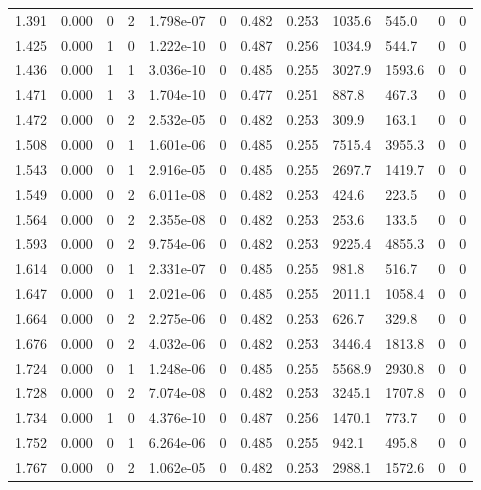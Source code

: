 \documentclass[preview]{standalone}
\begin{document}
{{{\begin{tabular}{L{1.2cm}C{1.2cm} C{0.3cm}C{0.5cm} C{1.4cm}C{1.4cm} C{1.4cm}C{1.4cm} C{1.6cm}C{1.6cm} C{1.6cm}C{1.6cm}}
  1.391  &  0.000  & 0     &  2 &  1.798e-07  & 0  &  0.482&   0.253& 1035.6 & 545.0   &  0 & 0  \\ 
  1.425  &  0.000  & 1     &  0 &  1.222e-10  & 0  &  0.487&   0.256& 1034.9 & 544.7   &  0 & 0  \\ 
  1.436  &  0.000  & 1     &  1 &  3.036e-10  & 0  &  0.485&   0.255& 3027.9 & 1593.6   &  0 & 0  \\ 
  1.471  &  0.000  & 1     &  3 &  1.704e-10  & 0  &  0.477&   0.251& 887.8 & 467.3   &  0 & 0  \\ 
  1.472  &  0.000  & 0     &  2 &  2.532e-05  & 0  &  0.482&   0.253& 309.9 & 163.1   &  0 & 0  \\ 
  1.508  &  0.000  & 0     &  1 &  1.601e-06  & 0  &  0.485&   0.255& 7515.4 & 3955.3   &  0 & 0  \\ 
  1.543  &  0.000  & 0     &  1 &  2.916e-05  & 0  &  0.485&   0.255& 2697.7 & 1419.7   &  0 & 0  \\ 
  1.549  &  0.000  & 0     &  2 &  6.011e-08  & 0  &  0.482&   0.253& 424.6 & 223.5   &  0 & 0  \\ 
  1.564  &  0.000  & 0     &  2 &  2.355e-08  & 0  &  0.482&   0.253& 253.6 & 133.5   &  0 & 0  \\ 
  1.593  &  0.000  & 0     &  2 &  9.754e-06  & 0  &  0.482&   0.253& 9225.4 & 4855.3   &  0 & 0  \\ 
  1.614  &  0.000  & 0     &  1 &  2.331e-07  & 0  &  0.485&   0.255& 981.8 & 516.7   &  0 & 0  \\ 
  1.647  &  0.000  & 0     &  1 &  2.021e-06  & 0  &  0.485&   0.255& 2011.1 & 1058.4   &  0 & 0  \\ 
  1.664  &  0.000  & 0     &  2 &  2.275e-06  & 0  &  0.482&   0.253& 626.7 & 329.8   &  0 & 0  \\ 
  1.676  &  0.000  & 0     &  2 &  4.032e-06  & 0  &  0.482&   0.253& 3446.4 & 1813.8   &  0 & 0  \\ 
  1.724  &  0.000  & 0     &  1 &  1.248e-06  & 0  &  0.485&   0.255& 5568.9 & 2930.8   &  0 & 0  \\ 
  1.728  &  0.000  & 0     &  2 &  7.074e-08  & 0  &  0.482&   0.253& 3245.1 & 1707.8   &  0 & 0  \\ 
  1.734  &  0.000  & 1     &  0 &  4.376e-10  & 0  &  0.487&   0.256& 1470.1 & 773.7   &  0 & 0  \\ 
  1.752  &  0.000  & 0     &  1 &  6.264e-06  & 0  &  0.485&   0.255& 942.1 & 495.8   &  0 & 0  \\ 
  1.767  &  0.000  & 0     &  2 &  1.062e-05  & 0  &  0.482&   0.253& 2988.1 & 1572.6   &  0 & 0  \\ 

\end{tabular}}}}
\end{document}
